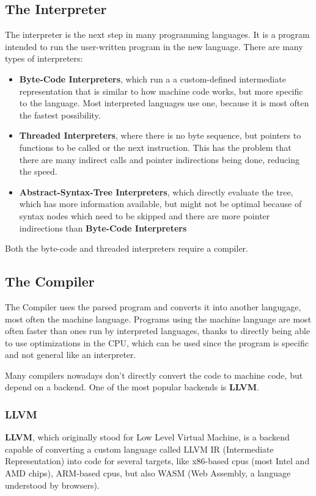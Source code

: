 \documentclass[12pt]{article}
\begin{document}
\subsection{The Interpreter}
The interpreter is the next step in many programming languages.
It is a program intended to run the user-written program in the new
language. There are many types of interpreters:
\begin{itemize}
	\item \textbf{Byte-Code Interpreters}, which run a
	      a custom-defined intermediate representation that is similar to how
	      machine code works, but more specific to the language. Most interpreted languages
	      use one, because it is most often the fastest possibility.
	\item \textbf{Threaded Interpreters}, where there is no byte sequence, but pointers
	      to functions to be called or the next instruction. This has the problem that there
	      are many indirect calls and pointer indirections being done, reducing the speed.
	\item \textbf{Abstract-Syntax-Tree Interpreters}, which directly evaluate the tree,
	      which has more information available, but might not be optimal because of syntax
	      nodes which need to be skipped and there are more pointer indirections than
	      \textbf{Byte-Code Interpreters}
\end{itemize}
Both the byte-code and threaded interpreters require a compiler.

\subsection{The Compiler}
The Compiler uses the parsed program and converts it into another langugage,
most often the machine language. Programs using the machine language are most often
faster than ones run by interpreted languages, thanks to directly being able to use
optimizations in the CPU, which can be used since the program is specific
and not general like an interpreter.

Many compilers nowadays don't directly convert the code to machine code,
but depend on a backend. One of the most popular backends is \textbf{LLVM}.

\subsubsection{LLVM}
\textbf{LLVM}, which originally stood for Low Level Virtual Machine, is
a backend capable of converting a custom language called
LLVM IR (Intermediate Representation) into code for several targets,
like x86-based cpus (most Intel and AMD chips), ARM-based cpus, but also
WASM (Web Assembly, a language understood by browsers).
\end{document}
